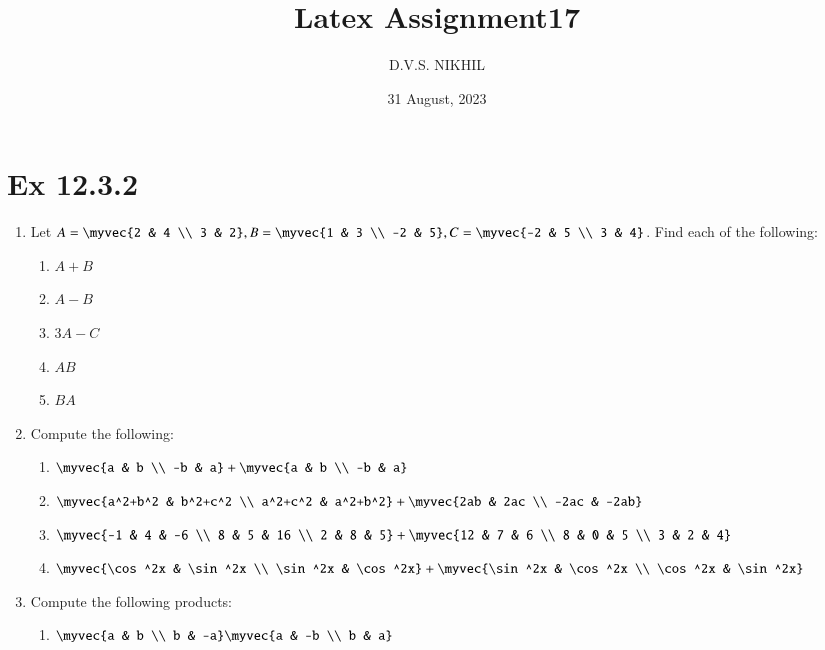 \documentclass{article}
\theoremstyle{remark}
\begin{document}
\title{Latex Assignment17}
\author{D.V.S. NIKHIL}
\date{31 August, 2023}
\maketitle
\section*{Ex 12.3.2}
\begin{enumerate}
\item Let $A= \myvec
 {2 & 4 \\ 3 & 2}, B=\myvec
 {1 & 3 \\ -2 & 5} , C=\myvec
{-2 & 5 \\ 3 & 4}$.
 Find each of the following:
\begin{enumerate}[label=(\roman*)]
\item $A+B$
\item $A-B$
\item $3A-C$
\item $AB$
\item $BA$
\end{enumerate}
\item Compute the following:
\begin{enumerate}[label=(\roman*)]
\item $\myvec  
{a & b \\ -b & a}+
\myvec{a & b \\ -b & a}$
\item $\myvec
{a^2+b^2 & b^2+c^2 \\ a^2+c^2 & a^2+b^2}+\myvec
{2ab & 2ac \\ -2ac & -2ab}$
\item $\myvec
{-1 & 4 & -6 \\ 8 & 5 & 16 \\ 2 & 8 & 5}+\myvec
{12 & 7 & 6 \\ 8 & 0 & 5 \\ 3 & 2 & 4}$
\item $\myvec
{\cos^2x & \sin^2x \\ \sin^2x & \cos^2x}+ \myvec{\sin^2x & \cos^2x \\ \cos^2x & \sin^2x}$
\end{enumerate}
\item Compute the following products:
\begin{enumerate}[label=(\roman*)]
\item $\myvec
{a & b  \\ b & -a} \myvec
{a & -b \\ b & a}$

\end{enumerate}
\end{enumerate}
\end{document}
